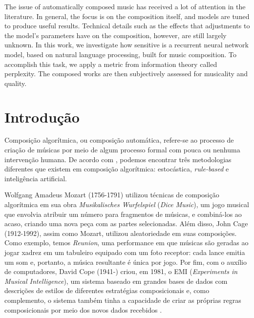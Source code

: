 \documentclass[twoside]{automatextcc}
\begin{document}
\newpage
\phantom{}

\begin{englishabstract}
The issue of automatically composed music has received a lot of attention in the literature. In general, the focus is on the composition itself, and models are tuned to produce useful results. Technical details such as the effects that adjustments to the model's parameters have on the composition, however, are still largely unknown. In this work, we investigate how sensitive is a recurrent neural network model, based on natural language processing,  built for music composition. To accomplish this task, we apply a metric from information theory called perplexity. The composed works are then subjectively assessed for musicality and quality.
\end{englishabstract}

\tableofcontents

\listoffigures

\listoftables



\chapter{Introdução}
Composição algorítmica, ou composição automática, refere-se ao processo de criação de músicas por meio de algum processo formal com pouca ou nenhuma intervenção humana. De acordo com \citet{maurer}, podemos encontrar três metodologias diferentes que existem em composição algorítmica: estocástica, \textit{rule-based} e inteligência artificial.

Wolfgang Amadeus Mozart (1756-1791) utilizou técnicas de composição algorítmica em sua obra \textit{Musikalisches Wurfelspiel} (\textit{Dice Music}), um jogo musical que envolvia atribuir um número para fragmentos de músicas, e combiná-los ao acaso, criando uma nova peça com as partes selecionadas. Além disso, John Cage (1912-1992), assim como Mozart, utilizou aleatoriedade em suas composições. Como exemplo, temos \textit{Reunion}, uma performance em que músicas são geradas ao jogar xadrez em um tabuleiro equipado com um foto receptor: cada lance emitia um som e, portanto, a música resultante é única por jogo. Por fim, com o auxílio de computadores, David Cope (1941-) criou, em 1981, o EMI (\textit{Experiments in Musical Intelligence}), um sistema baseado em grandes bases de dados com descrições de estilos de diferentes estratégias composicionais e, como complemento, o sistema também tinha a capacidade de criar as próprias regras composicionais por meio dos novos dados recebidos \citep{alpern1995, maurer}. 
\end{document}
